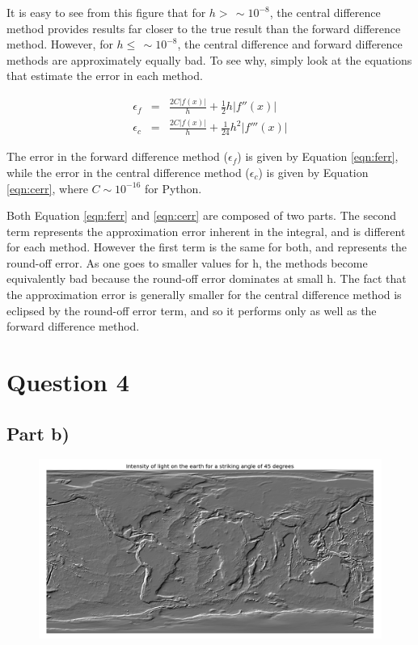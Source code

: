 \documentclass[a4paper,12pt]{article}
\begin{document}
It is easy to see from this figure that for $h >\,\sim 10^{-8}$, the central difference method provides results far closer to the true result than the forward difference method. However, for $h \leq\, \sim 10^{-8}$, the central difference and forward difference methods are approximately equally bad. To see why, simply look at the equations that estimate the error in each method.

\begin{eqnarray}
\label{eqn:ferr}
\epsilon_f &=& \frac{2C|f(x)|}{h} + \frac{1}{2}h|f''(x)|\\
\epsilon_c &=& \frac{2C|f(x)|}{h} + \frac{1}{24}h^2|f'''(x)|
\label{eqn:cerr}
\end{eqnarray}

The error in the forward difference method ($\epsilon_f$) is given by Equation \ref{eqn:ferr}, while the error in the central difference method ($\epsilon_c$) is given by Equation \ref{eqn:cerr}, where $C\sim10^{-16}$ for Python.

Both Equation \ref{eqn:ferr} and \ref{eqn:cerr} are composed of two parts. The second term represents the approximation error inherent in the integral, and is different for each method. However the first term is the same for both, and represents the round-off error. As one goes to smaller values for h, the methods become equivalently bad because the round-off error dominates at small h. The fact that the approximation error is generally smaller for the central difference method is eclipsed by the round-off error term, and so it performs only as well as the forward difference method.

\section{Question 4}
\subsection{Part b)}

\begin{figure}[H]
\centering
\includegraphics[width = \linewidth]{lab3q4b.png}
\caption{}
\label{fig:q4b}
\end{figure}
\end{document}
